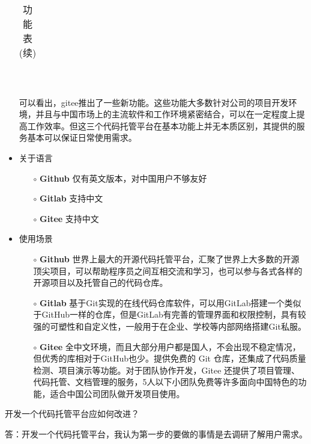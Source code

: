 \documentclass{homework}
\begin{document}
\begin{itemize}
\begin{table}[!htbp]
\begin{tabular}{ccccccccccc}
				\bottomrule
			\end{tabular}
			\caption{功能表(续)}
		\end{table}
		\\
		\par 可以看出，gitee推出了一些新功能。这些功能大多数针对公司的项目开发环境，并且与中国市场上的主流软件和工作环境紧密结合，可以在一定程度上提高工作效率。但这三个代码托管平台在基本功能上并无本质区别，其提供的服务基本可以保证日常使用需求。
	\item 关于语言
		\begin{itemize}
			\item[$\circ$] \textbf{Github} 仅有英文版本，对中国用户不够友好
			\item[$\circ$] \textbf{Gitlab} 支持中文
			\item[$\circ$] \textbf{Gitee} 支持中文 
		\end{itemize}
	\item 使用场景
		\begin{itemize}
			\item[$\circ$] \textbf{Github} 世界上最大的开源代码托管平台，汇聚了世界上大多数的开源顶尖项目，可以帮助程序员之间互相交流和学习，也可以参与各式各样的开源项目以及托管自己的代码仓库。
			\item[$\circ$] \textbf{Gitlab} 基于Git实现的在线代码仓库软件，可以用GitLab搭建一个类似于GitHub一样的仓库，但是GitLab有完善的管理界面和权限控制，具有较强的可塑性和自定义性，一般用于在企业、学校等内部网络搭建Git私服。
			\item[$\circ$] \textbf{Gitee} 全中文环境，而且大部分用户都是国人，不会出现不稳定情况，但优秀的库相对于GitHub也少。提供免费的 Git 仓库，还集成了代码质量检测、项目演示等功能。对于团队协作开发，Gitee 还提供了项目管理、代码托管、文档管理的服务，5人以下小团队免费等许多面向中国特色的功能，适合中国公司团队做开发项目使用。

		\end{itemize}
\end{itemize}


\question \large{开发一个代码托管平台应如何改进？}

\normalsize 答：开发一个代码托管平台，我认为第一步的要做的事情是去调研了解用户需求。
\end{document}
